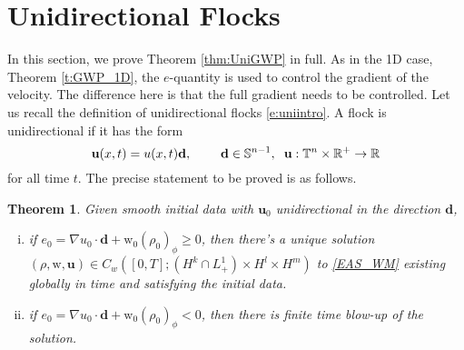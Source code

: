 \documentclass[11pt,letterpaper]{amsart}
\theoremstyle{plain}
\newtheorem{theorem}[THEOREM]{Theorem}
\theoremstyle{definition}
\theoremstyle{remark}
\newcommand{\R}{\ensuremath{\mathbb{R}}}   %
\newcommand{\T}{\ensuremath{\mathbb{T}}}   %
\def \bd {{\bf d}}
\renewcommand{\geq}{\geqslant}
\def\R{\mathbb{R}}
\def\T{\mathbb{T}}
\def\u{\textbf{u}}
\def\bd{\textbf{d}}
\def \wt {\mathrm{w}}
\begin{document}
\section{Unidirectional Flocks}
\label{UniGWP}
In this section, we prove Theorem \ref{thm:UniGWP} in full.  As in the 1D case, Theorem \ref{t:GWP_1D},
the $e$-quantity is used to control the gradient of the velocity.  The difference here is that the full gradient 
needs to be controlled.  Let us recall the definition of unidirectional flocks \eqref{e:uniintro}. 
A flock is unidirectional if it has the form 
$$
    \u(x,t) = u(x,t) \bd, \hspace{8mm} \bd \in \mathbb{S}^{n-1}, \hspace{2mm} \u: \T^n \times \R^+ \to \R
$$
for all time $t$.  The precise statement to be proved is as follows. 
\begin{theorem}\label{t:uni}
    Given smooth initial data with $\u_0$ unidirectional in the direction $\bd$, 
    \begin{enumerate}[(i)]
        \item if $e_0 = \nabla u_0 \cdot \bd + \wt_0 (\rho_0)_{\phi} \geq 0$, then there's a unique solution 
          $(\rho, \wt, \u) \in C_w([0,T]; (H^k \cap L^1_+) \times H^l \times H^m)$ to \eqref{EAS_WM}
          existing globally in time and satisfying the initial data. 
        \item if $e_0 = \nabla u_0 \cdot \bd + \wt_0 (\rho_0)_{\phi} < 0$, then there is finite time blow-up 
        of the solution.
    \end{enumerate}
\end{theorem}
\end{document}
